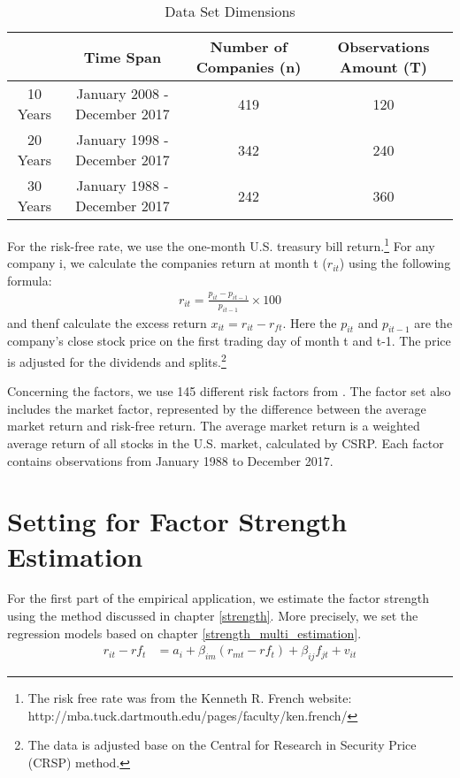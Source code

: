 \begin{table}[H]
	\centering
		\caption{Data Set Dimensions}
			\label{Data_set}
	\begin{tabular}{c|ccc}
		\hline
		& Time Span                    & Number of Companies (n) & Observations Amount (T) \\ \hline
		10 Years & January 2008 - December 2017 & 419                  & 120                     \\
		20 Years & January 1998 - December 2017 & 342                  & 240                     \\
		30 Years & January 1988 - December 2017 & 242                  & 360                     \\ \hline
	\end{tabular}
\end{table}
For the risk-free rate, we use the one-month U.S. treasury bill return.\footnote{ The risk free rate was from the Kenneth R. French website: http://mba.tuck.dartmouth.edu/pages/faculty/ken.french/}
For any company i, we calculate the companies return at month t ($r_{it}$) using the following formula:
\begin{align*}
r_{it} = \frac{p_{i t} - p_{i t-1}}{p_{i t-1}}\times 100
\end{align*}
and thenf calculate the excess return $x_{it} = r_{it} - r_{ft}$.
Here the $p_{it}$ and $p_{i t-1}$ are the company's close stock price on the first trading day of month t and t-1.
The price is adjusted for the dividends and splits.\footnote{The data is adjusted base on the Central for Research in Security Price (CRSP) method.}

Concerning the factors, we use 145 different risk factors from .
The factor set also includes the market factor, represented by the difference between the average market return and risk-free return.
The average market return is a weighted average return of all stocks in the U.S. market, calculated by CSRP.
Each factor contains observations from January 1988 to December 2017.

\section{Setting for Factor Strength Estimation}
For the first part of the empirical application, we estimate the factor strength using the method discussed in chapter \ref{strength}.
More precisely, we set the regression models based on chapter \ref{strength_multi_estimation}.
\begin{align*}
r_{it} - rf_{t} &= a_i + \beta_{im}(r_{mt} - rf_{t}) + \beta_{ij}f_{jt} + v_{it} 
\end{align*}

